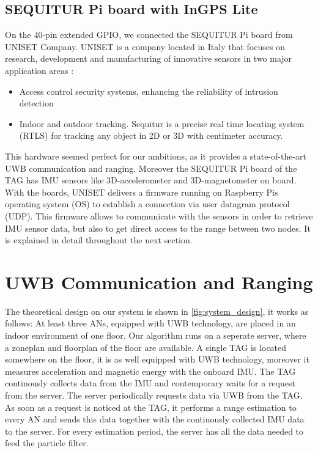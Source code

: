 \subsection{SEQUITUR Pi board with InGPS Lite}
On the 40-pin extended GPIO, we connected the SEQUITUR Pi board from UNISET Company. UNISET is a company located in Italy that focuses on research, development and manufacturing of innovative sensors in two major application areas \cite{Uniset}:
\begin{itemize}
\item Access control security systems, enhancing the reliability of intrusion detection
\item Indoor and outdoor tracking. Sequitur is a precise real time locating system (RTLS) for tracking any object in 2D or 3D with centimeter accuracy.
\end{itemize}
This hardware seemed perfect for our ambitions, as it provides a state-of-the-art UWB communication and ranging. Moreover the SEQUITUR Pi board of the TAG has IMU sensors like 3D-accelerometer and 3D-magnetometer on board. With the boards, UNISET delivers a firmware running on Raspberry Pis operating system (OS) to establish a connection via user datagram protocol (UDP). This firmware allows to communicate with the sensors in order to retrieve IMU sensor data, but also to get direct access to the range between two nodes. It is explained in detail throughout the next section. 


\section{UWB Communication and Ranging}
The theoretical design on our system is shown in \ref{fig:system_design}, it works as follows:
At least three ANs, equipped with UWB technology, are placed in an indoor environment of one floor. Our algorithm runs on a seperate server, where a zoneplan and floorplan of the floor are available. A single TAG is located somewhere on the floor, it is as well equipped with UWB technology, moreover it measures acceleration and magnetic energy with the onboard IMU. The TAG continously collects data from the IMU and contemporary waits for a request from the server. The server periodically requests data via UWB from the TAG. As soon as a request is noticed at the TAG, it performs a range estimation to every AN and sends this data together with the continously collected IMU data to the server.
For every estimation period, the server has all the data needed to feed the particle filter.

